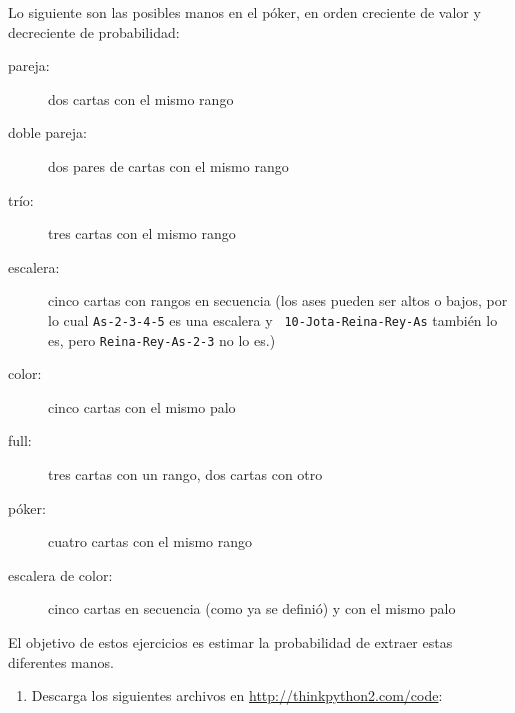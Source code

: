 \documentclass[10pt]{book}
\begin{document}
\begin{exercise}
\label{poker}

Lo siguiente son las posibles manos en el póker, en orden creciente
de valor y decreciente de probabilidad:

\begin{description}

\item[pareja:] dos cartas con el mismo rango
\vspace{-0.05in}

\item[doble pareja:] dos pares de cartas con el mismo rango
\vspace{-0.05in}

\item[trío:] tres cartas con el mismo rango
\vspace{-0.05in}

\item[escalera:] cinco cartas con rangos en secuencia (los ases pueden
ser altos o bajos, por lo cual {\tt As-2-3-4-5} es una escalera y {\tt
10-Jota-Reina-Rey-As} también lo es, pero {\tt Reina-Rey-As-2-3} no lo es.)
\vspace{-0.05in}

\item[color:] cinco cartas con el mismo palo
\vspace{-0.05in}

\item[full:] tres cartas con un rango, dos cartas con otro
\vspace{-0.05in}

\item[póker:] cuatro cartas con el mismo rango
\vspace{-0.05in}

\item[escalera de color:] cinco cartas en secuencia (como ya se definió) y
con el mismo palo
\vspace{-0.05in}

\end{description}
%
El objetivo de estos ejercicios es estimar
la probabilidad de extraer estas diferentes manos.

\begin{enumerate}

\item Descarga los siguientes archivos en \url{http://thinkpython2.com/code}:

\begin{description}


\end{description}
\end{enumerate}
\end{exercise}
\end{document}
